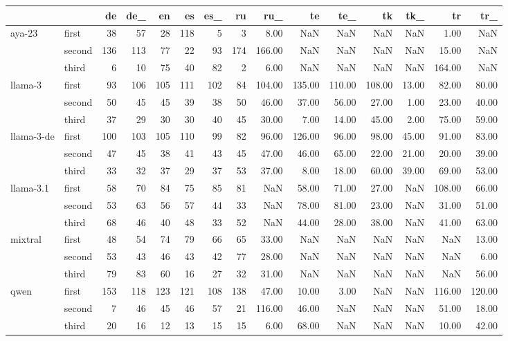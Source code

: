 \begin{tabular}{llrrrrrrrrrrrrr}
\toprule
 &  & de & de_ & en & es & es_ & ru & ru_ & te & te_ & tk & tk_ & tr & tr_ \\
\midrule
\multirow[t]{3}{*}{aya-23} & first & 38 & 57 & 28 & 118 & 5 & 3 & 8.00 & NaN & NaN & NaN & NaN & 1.00 & NaN \\
 & second & 136 & 113 & 77 & 22 & 93 & 174 & 166.00 & NaN & NaN & NaN & NaN & 15.00 & NaN \\
 & third & 6 & 10 & 75 & 40 & 82 & 2 & 6.00 & NaN & NaN & NaN & NaN & 164.00 & NaN \\
\cline{1-15}
\multirow[t]{3}{*}{llama-3} & first & 93 & 106 & 105 & 111 & 102 & 84 & 104.00 & 135.00 & 110.00 & 108.00 & 13.00 & 82.00 & 80.00 \\
 & second & 50 & 45 & 45 & 39 & 38 & 50 & 46.00 & 37.00 & 56.00 & 27.00 & 1.00 & 23.00 & 40.00 \\
 & third & 37 & 29 & 30 & 30 & 40 & 45 & 30.00 & 7.00 & 14.00 & 45.00 & 2.00 & 75.00 & 59.00 \\
\cline{1-15}
\multirow[t]{3}{*}{llama-3-de} & first & 100 & 103 & 105 & 110 & 99 & 82 & 96.00 & 126.00 & 96.00 & 98.00 & 45.00 & 91.00 & 83.00 \\
 & second & 47 & 45 & 38 & 41 & 43 & 45 & 47.00 & 46.00 & 65.00 & 22.00 & 21.00 & 20.00 & 39.00 \\
 & third & 33 & 32 & 37 & 29 & 37 & 53 & 37.00 & 8.00 & 18.00 & 60.00 & 39.00 & 69.00 & 53.00 \\
\cline{1-15}
\multirow[t]{3}{*}{llama-3.1} & first & 58 & 70 & 84 & 75 & 85 & 81 & NaN & 58.00 & 71.00 & 27.00 & NaN & 108.00 & 66.00 \\
 & second & 53 & 63 & 56 & 57 & 44 & 33 & NaN & 78.00 & 81.00 & 23.00 & NaN & 31.00 & 51.00 \\
 & third & 68 & 46 & 40 & 48 & 33 & 52 & NaN & 44.00 & 28.00 & 38.00 & NaN & 41.00 & 63.00 \\
\cline{1-15}
\multirow[t]{3}{*}{mixtral} & first & 48 & 54 & 74 & 79 & 66 & 65 & 33.00 & NaN & NaN & NaN & NaN & NaN & 13.00 \\
 & second & 53 & 43 & 46 & 43 & 42 & 77 & 28.00 & NaN & NaN & NaN & NaN & NaN & 6.00 \\
 & third & 79 & 83 & 60 & 16 & 27 & 32 & 31.00 & NaN & NaN & NaN & NaN & NaN & 56.00 \\
\cline{1-15}
\multirow[t]{3}{*}{qwen} & first & 153 & 118 & 123 & 121 & 108 & 138 & 47.00 & 10.00 & 3.00 & NaN & NaN & 116.00 & 120.00 \\
 & second & 7 & 46 & 45 & 46 & 57 & 21 & 116.00 & 46.00 & NaN & NaN & NaN & 51.00 & 18.00 \\
 & third & 20 & 16 & 12 & 13 & 15 & 15 & 6.00 & 68.00 & NaN & NaN & NaN & 10.00 & 42.00 \\
\cline{1-15}
\bottomrule
\end{tabular}
